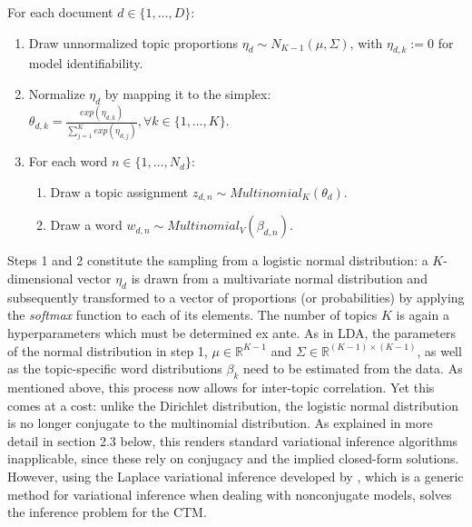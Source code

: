 \vspace{0.25cm}
\noindent
For each document $d \in \{1,\dots,D\}$:

\begin{enumerate}[{1)}]
\vspace{-0.25cm}
\item Draw unnormalized topic proportions $\eta_d \sim N_{K-1}(\mu, \Sigma)$, with $\eta_{d,k} := 0$ for model identifiability.
\vspace{-0.25cm}
\item Normalize $\eta_d$ by mapping it to the simplex: $\theta_{d,k} = \frac{exp(\eta_{d,k})}{\sum_{j=1}^{K}exp(\eta_{d,j})}, \forall k \in \{1,\dots,K\}$.
\vspace{-0.25cm}
\item For each word $n \in \{1,\dots,N_d\}$:
	\begin{enumerate}[{a)}]
	\vspace{-0.25cm}    
    \item Draw a topic assignment $z_{d,n} \sim Multinomial_K(\theta_d)$.
	\vspace{-0.25cm}    
    \item Draw a word $w_{d,n} \sim Multinomial_V(\beta_{d,n})$.
	\end{enumerate}
\end{enumerate}

\noindent
Steps 1 and 2 constitute the sampling from a logistic normal distribution: a $K$-dimensional vector $\eta_d$ is drawn from a multivariate normal distribution and subsequently transformed to a vector of proportions (or probabilities) by applying the \textit{softmax} function to each of its elements. The number of topics $K$ is again a hyperparameters which must be determined ex ante. As in LDA, the parameters of the normal distribution in step 1, $\mu \in \mathbb{R}^{K-1}$ and $\Sigma \in \mathbb{R}^{(K-1) \times (K-1)}$, as well as the topic-specific word distributions $\beta_k$ need to be estimated from the data. As mentioned above, this process now allows for inter-topic correlation. Yet this comes at a cost: unlike the Dirichlet distribution, the logistic normal distribution is no longer conjugate to the multinomial distribution. As explained in more detail in section 2.3 below, this renders standard variational inference algorithms inapplicable, since these rely on conjugacy and the implied closed-form solutions. However, using the Laplace variational inference developed by \cite{wang2013variational}, which is a generic method for variational inference when dealing with nonconjugate models, solves the inference problem for the CTM.

